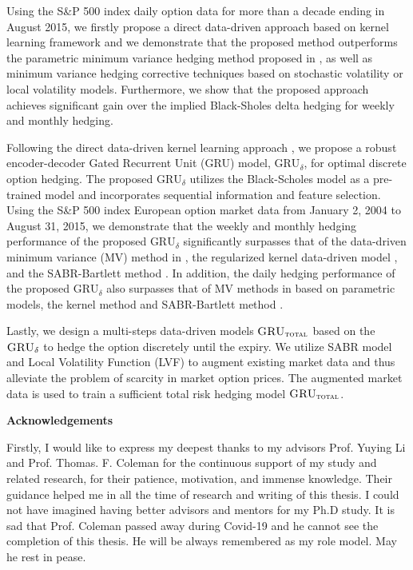 Using the S\&P 500 index daily option data for more than a decade ending in August 2015, we firstly propose a direct data-driven approach \citep{knian2017} based on kernel learning framework and we demonstrate  that the proposed method outperforms the parametric minimum variance hedging method proposed in \citep{hulloptimal}, as well as  minimum variance hedging corrective techniques based on stochastic volatility or local volatility models.
Furthermore, we show that the proposed approach achieves significant gain over the implied Black-Sholes delta hedging for weekly and monthly hedging.

Following the direct data-driven kernel learning approach \citep{knian2017}, we propose a robust encoder-decoder  Gated Recurrent Unit (GRU) model, $\text{GRU}_{\delta}$, for optimal discrete option hedging. The proposed $\text{GRU}_{\delta}$ utilizes the Black-Scholes model as a pre-trained model and  incorporates sequential information and feature selection.  Using the S\&P 500 index European option market data from January 2, 2004 to August 31, 2015,   we demonstrate that the weekly and monthly hedging performance of the proposed $\text{GRU}_{\delta}$ significantly surpasses that of the data-driven minimum variance (MV) method in \citep{hulloptimal}, the regularized kernel data-driven model \citep{knian2017}, and the SABR-Bartlett method \cite{hagan2017bartlett}.
In addition, the daily hedging performance of the proposed $\text{GRU}_{\delta}$ also surpasses that of MV methods in \cite{hulloptimal} based on parametric models, the kernel method \citep{knian2017} and SABR-Bartlett method \cite{hagan2017bartlett}.

Lastly, we design a multi-steps data-driven models $\textsc{GRU}_{\textsc{total}}$ based on the $\textsc{GRU}_\delta$  to hedge the option discretely until the expiry.  We utilize SABR model and Local Volatility Function (LVF) to augment existing market data and thus alleviate the problem of  scarcity in market option prices. The augmented market data is used to train a sufficient  total risk hedging model $\textsc{GRU}_{\textsc{total}}$.
\cleardoublepage


\begin{center}\textbf{Acknowledgements}\end{center}

Firstly, I would like to express my deepest thanks to my advisors Prof. Yuying Li and Prof. Thomas. F. Coleman for the continuous support of my study and related research, for their patience, motivation, and immense knowledge. Their guidance helped me in all the time of research and writing of this thesis. I could not have imagined having  better advisors and mentors for my Ph.D study. It is sad that Prof. Coleman passed away during Covid-19 and he cannot see the completion of this thesis. He will be always remembered as my role model. May he rest in pease.  

